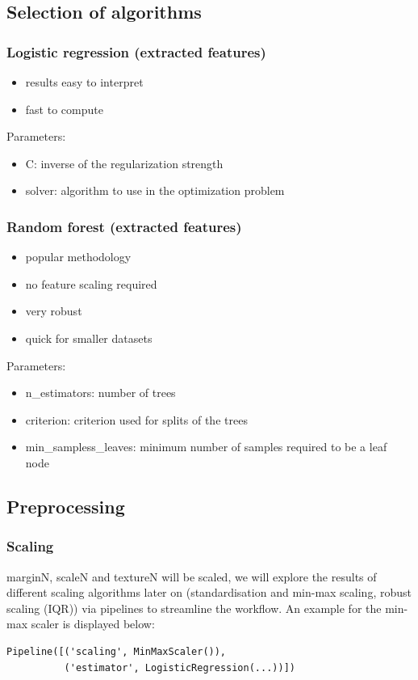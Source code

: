 \documentclass{sig-alternate-05-2015}
\begin{document}
\subsection{Selection of algorithms}
\subsubsection{Logistic regression (extracted features)}
\begin{itemize}
  \item results easy to interpret
  \item fast to compute
\end{itemize}

Parameters:
\begin{itemize}
  \item C: inverse of the regularization strength
  \item solver: algorithm to use in the optimization problem
\end{itemize}


\subsubsection{Random forest (extracted features)}
\begin{itemize}
  \item popular methodology
  \item no feature scaling required
  \item very robust
  \item quick for smaller datasets
\end{itemize}

Parameters:
\begin{itemize}
  \item n\_estimators: number of trees
  \item criterion: criterion used for splits of the trees
  \item min\_sampless\_leaves: minimum number of samples required to be a leaf node 
\end{itemize}

\subsection{Preprocessing}

\subsubsection{Scaling}
marginN, scaleN and textureN will be scaled, we will explore the results of different scaling algorithms later on (standardisation and min-max scaling, robust scaling (IQR)) via pipelines to streamline the workflow.
An example for the min-max scaler is displayed below:
\begin{verbatim}
Pipeline([('scaling', MinMaxScaler()),
          ('estimator', LogisticRegression(...))])
\end{verbatim}
\end{document}
